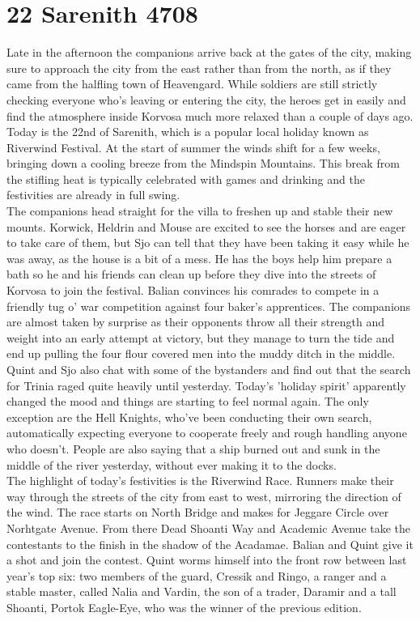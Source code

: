 \section{22 Sarenith 4708}

Late in the afternoon the companions arrive back at the gates of the city, making sure to approach the city from the east rather than from the north, as if they came from the halfling town of Heavengard. While soldiers are still strictly checking everyone who's leaving or entering the city, the heroes get in easily and find the atmosphere inside Korvosa much more relaxed than a couple of days ago. Today is the 22nd of Sarenith, which is a popular local holiday known as Riverwind Festival. At the start of summer the winds shift for a few weeks, bringing down a cooling breeze from the Mindspin Mountains. This break from the stifling heat is typically celebrated with games and drinking and the festivities are already in full swing.\\

The companions head straight for the villa to freshen up and stable their new mounts. Korwick, Heldrin and Mouse are excited to see the horses and are eager to take care of them, but Sjo can tell that they have been taking it easy while he was away, as the house is a bit of a mess. He has the boys help him prepare a bath so he and his friends can clean up before they dive into the streets of Korvosa to join the festival. Balian convinces his comrades to compete in a friendly tug o' war competition against four baker's apprentices. The companions are almost taken by surprise as their opponents throw all their strength and weight into an early attempt at victory, but they manage to turn the tide and end up pulling the four flour covered men into the muddy ditch in the middle.\\

Quint and Sjo also chat with some of the bystanders and find out that the search for Trinia raged quite heavily until yesterday. Today's 'holiday spirit' apparently changed the mood and things are starting to feel normal again. The only exception are the Hell Knights, who've been conducting their own search, automatically expecting everyone to cooperate freely and rough handling anyone who doesn't. People are also saying that a ship burned out and sunk in the middle of the river yesterday, without ever making it to the docks.\\

The highlight of today's festivities is the Riverwind Race. Runners make their way through the streets of the city from east to west, mirroring the direction of the wind. The race starts on North Bridge and makes for Jeggare Circle over Norhtgate Avenue. From there Dead Shoanti Way and Academic Avenue take the contestants to the finish in the shadow of the Acadamae. Balian and Quint give it a shot and join the contest. Quint worms himself into the front row between last year's top six: two members of the guard, Cressik and Ringo, a ranger and a stable master, called Nalia and Vardin, the son of a trader, Daramir and a tall Shoanti, Portok Eagle-Eye, who was the winner of the previous edition.\\

